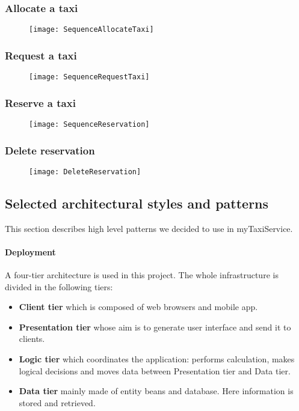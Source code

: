 \newpage
\subsubsection{Allocate a taxi} %
\begin{figure}[h!]
    \centering
    \texttt{[image: SequenceAllocateTaxi]}
\end{figure}

\newpage
\subsubsection{Request a taxi} %
\begin{figure}[h!]
    \centering
    \texttt{[image: SequenceRequestTaxi]}
\end{figure}

\newpage
\subsubsection{Reserve a taxi} %
\begin{figure}[h!]
    \centering
    \texttt{[image: SequenceReservation]}
\end{figure}

\newpage
\subsubsection{Delete reservation} %
\begin{figure}[h!]
    \centering
    \texttt{[image: DeleteReservation]}
\end{figure}

\newpage
\subsection{Selected architectural styles and patterns}
This section describes high level patterns we decided to use in myTaxiService.

\paragraph{Deployment} A four-tier architecture is used in this project.
The whole infrastructure is divided in the following tiers:

\begin{itemize}
    \item{\textbf{Client tier} which is composed of web browsers and mobile app.}
    \item{\textbf{Presentation tier} whose aim is to generate user interface and send it to clients.}
    \item{\textbf{Logic tier} which coordinates the application: performs calculation, makes logical decisions and moves data between Presentation tier and Data tier.}
    \item{\textbf{Data tier} mainly made of entity beans and database. 
    Here information is stored and retrieved.}
\end{itemize}

